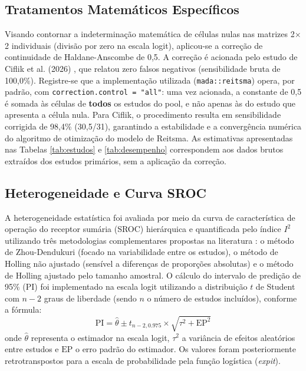 \documentclass[12pt,a4paper]{article}
\begin{document}
\subsection{Tratamentos Matemáticos Específicos}
Visando contornar a indeterminação matemática de células nulas nas matrizes 2$\times$2 individuais (divisão por zero na escala logit), aplicou-se a correção de continuidade de Haldane-Anscombe de 0,5. A correção é acionada pelo estudo de Ciflik et al. (2026) \cite{ciflik}, que relatou zero falsos negativos (sensibilidade bruta de 100,0\%). Registre-se que a implementação utilizada (\texttt{mada::reitsma}) opera, por padrão, com \texttt{correction.control = "all"}: uma vez acionada, a constante de 0,5 é somada às células de \textbf{todos} os estudos do pool, e não apenas às do estudo que apresenta a célula nula. Para Ciflik, o procedimento resulta em sensibilidade corrigida de 98,4\% (30,5/31), garantindo a estabilidade e a convergência numérica do algoritmo de otimização do modelo de Reitsma. As estimativas apresentadas nas Tabelas \ref{tab:estudos} e \ref{tab:desempenho} correspondem aos dados brutos extraídos dos estudos primários, sem a aplicação da correção.

\subsection{Heterogeneidade e Curva SROC}
A heterogeneidade estatística foi avaliada por meio da curva de característica de operação do receptor sumária (SROC) hierárquica e quantificada pelo índice $I^2$ utilizando três metodologias complementares propostas na literatura \cite{takwoingi}: o método de Zhou-Dendukuri (focado na variabilidade entre os estudos), o método de Holling não ajustado (sensível a diferenças de proporções absolutas) e o método de Holling ajustado pelo tamanho amostral. O cálculo do intervalo de predição de 95\% (PI) foi implementado na escala logit utilizando a distribuição $t$ de Student com $n-2$ graus de liberdade (sendo $n$ o número de estudos incluídos), conforme a fórmula:
\begin{equation}
\text{PI} = \hat{\theta} \pm t_{n-2, 0.975} \times \sqrt{\tau^2 + \text{EP}^2}
\end{equation}
onde $\hat{\theta}$ representa o estimador na escala logit, $\tau^2$ a variância de efeitos aleatórios entre estudos e $\text{EP}$ o erro padrão do estimador. Os valores foram posteriormente retrotranspostos para a escala de probabilidade pela função logística (\textit{expit}).
\end{document}
